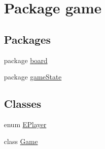 \hypertarget{namespacegame}{}\section{Package game}
\label{namespacegame}
\subsection*{Packages}
\begin{DoxyCompactItemize}
\item 
package \mbox{\hyperlink{namespacegame_1_1board}{board}}
\item 
package \mbox{\hyperlink{namespacegame_1_1game_state}{game\+State}}
\end{DoxyCompactItemize}
\subsection*{Classes}
\begin{DoxyCompactItemize}
\item 
enum \mbox{\hyperlink{enumgame_1_1_e_player}{E\+Player}}
\item 
class \mbox{\hyperlink{classgame_1_1_game}{Game}}
\end{DoxyCompactItemize}
